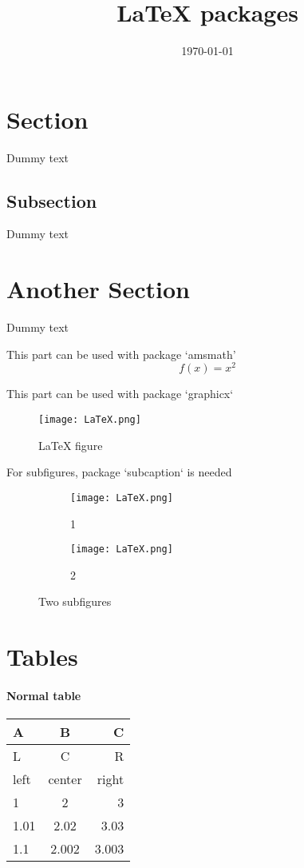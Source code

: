 \documentclass{article}
\title{LaTeX packages}
\date{\today}
\begin{document}
\maketitle
\newpage
\doublespacing
\tableofcontents
\singlespacing
\newpage

\section{Section}
Dummy text
\subsection{Subsection}
Dummy text
\section{Another Section}
Dummy text

This part can be used with package `amsmath'
\begin{equation*}
  f(x) = x^2
\end{equation*}

This part can be used with package `graphicx`
\begin{figure}[h!]
  \texttt{[image: LaTeX.png]}
  \caption{LaTeX figure}
  \label{fig:LaTeX}
\end{figure}

For subfigures, package `subcaption` is needed
\begin{figure}[h!]
  \centering
  \begin{subfigure}[b]{0.4\linewidth}
    \texttt{[image: LaTeX.png]}
    \caption{1}
  \end{subfigure}
  \begin{subfigure}[b]{0.4\linewidth}
    \texttt{[image: LaTeX.png]}
    \caption{2}
  \end{subfigure}
  \caption{Two subfigures}
  \label{fig:LaTeX2}
\end{figure}

\newpage
\section{Tables}
\paragraph{Normal table}
\begin{tabular}{| l | c | r |}
\hline
A & B & C\\
\hline
L & C & R\\
left & center & right\\
\hline
1 & 2 & 3\\
\hline
1.01 & 2.02 & 3.03\\
\hline
1.1 & 2.002 & 3.003\\
\hline
\end{tabular}
\end{document}
